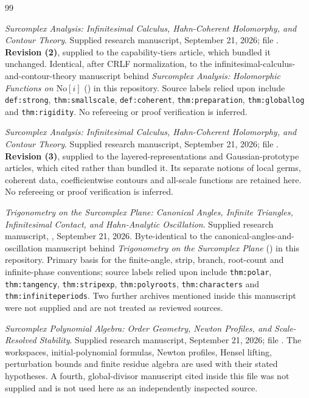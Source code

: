 \documentclass[11pt,letterpaper]{article}
\numberwithin{equation}{section}
\theoremstyle{definition}
\theoremstyle{remark}
\begin{document}
\clearpage
\begin{thebibliography}{99}
\small
\setlength{\itemsep}{0.35em}

\emph{Surcomplex Analysis: Infinitesimal Calculus, Hahn-Coherent Holomorphy,
and Contour Theory}. Supplied research manuscript, September 21, 2026; file
. \textbf{Revision (2)}, supplied to the
capability-tiers article, which bundled it unchanged. Identical, after CRLF
normalization, to the infinitesimal-calculus-and-contour-theory manuscript
behind \emph{Surcomplex Analysis: Holomorphic Functions on $\mathrm{No}[i]$}
()
in this repository. Source labels relied upon include \texttt{def:strong},
\texttt{thm:smallscale}, \texttt{def:coherent}, \texttt{thm:preparation},
\texttt{thm:globallog} and \texttt{thm:rigidity}. No refereeing or proof
verification is inferred.

\emph{Surcomplex Analysis: Infinitesimal Calculus, Hahn-Coherent Holomorphy,
and Contour Theory}. Supplied research manuscript, September 21, 2026; file
. \textbf{Revision (3)}, supplied to the
layered-representations and Gaussian-prototype articles, which cited rather than
bundled it. Its separate notions of local germs, coherent data, coefficientwise
contours and all-scale functions are retained here. No refereeing or proof
verification is inferred.

\emph{Trigonometry on the Surcomplex Plane: Canonical Angles, Infinite
Triangles, Infinitesimal Contact, and Hahn-Analytic Oscillation}. Supplied
research manuscript, , September 21, 2026.
Byte-identical to the canonical-angles-and-oscillation manuscript behind
\emph{Trigonometry on the Surcomplex Plane}
()
in this repository. Primary basis for the finite-angle, strip, branch,
root-count and infinite-phase conventions; source labels relied upon include
\texttt{thm:polar}, \texttt{thm:tangency}, \texttt{thm:stripexp},
\texttt{thm:polyroots}, \texttt{thm:characters} and
\texttt{thm:infiniteperiods}. Two further archives mentioned inside this
manuscript were not supplied and are not treated as reviewed sources.

\emph{Surcomplex Polynomial Algebra: Order Geometry, Newton Profiles, and
Scale-Resolved Stability}. Supplied research manuscript, September 21, 2026;
file . The workspaces,
initial-polynomial formulas, Newton profiles, Hensel lifting, perturbation
bounds and finite residue algebra are used with their stated hypotheses. A
fourth, global-divisor manuscript cited inside this file was not supplied and is
not used here as an independently inspected source.


\end{thebibliography}
\end{document}
